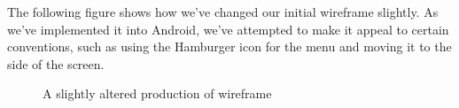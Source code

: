 \documentclass[11pt]{article}
\begin{document}
The following figure shows how we've changed our initial wireframe slightly. As we've implemented it into Android, we've attempted to make it appeal to certain conventions, such as using the Hamburger icon for the menu and moving it to the side of the screen.

\begin{figure}[h]
	
	\caption{A slightly altered production of wireframe}
	
\end{figure}
\end{document}
